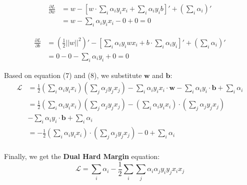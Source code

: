 \documentclass[a4paper,12pt]{article}
\begin{document}
\begin{equation}
    \begin{aligned}
        \frac{\partial L}{\partial w} &= w - \left[w\cdot \sum_i\alpha_iy_ix_i + \sum_i\alpha_iy_ib \right]' + (\sum_i\alpha_i)' \\
        &= w - \sum_i\alpha_iy_ix_i - 0 + 0 = 0
    \end{aligned}
\end{equation}

\begin{equation}
    \begin{aligned}
        \frac{\partial L}{\partial b} &= (\frac{1}{2}||w||^2)' - \left[\sum_i\alpha_iy_iwx_i + b\cdot\sum_i\alpha_iy_i \right]' + (\sum_i\alpha_i)' \\
        &= 0 - 0 - \sum_i\alpha_iy_i + 0 = 0
    \end{aligned}
\end{equation}

Based on equation (7) and (8), we substitute $\textbf{w}$ and $\textbf{b}$:
\begin{equation}
    \begin{aligned}
        \mathcal{L} &= \frac{1}{2}(\sum_i\alpha_iy_ix_i)(\sum_j\alpha_jy_jx_j) - \sum_i\alpha_iy_ix_i \cdot \textbf{w} -  \sum_i\alpha_iy_i \cdot \textbf{b} + \sum_i\alpha_i \\
        &= \frac{1}{2}(\sum_i\alpha_iy_ix_i)(\sum_j\alpha_jy_jx_j) - (\sum_i\alpha_iy_ix_i) \cdot (\sum_j\alpha_jy_jx_j) \\
        & - \sum_i\alpha_iy_i \cdot \textbf{b} + \sum_i\alpha_i \\
        &= -\frac{1}{2}(\sum_i\alpha_iy_ix_i) \cdot (\sum_j\alpha_jy_jx_j) -  0 + \sum_i\alpha_i \\
    \end{aligned}
\end{equation}

Finally, we get the \textbf{Dual Hard Margin} equation:
\begin{equation}
    \mathcal{L} = \sum_i\alpha_i -\frac{1}{2}\sum_i\sum_j\alpha_i\alpha_jy_iy_jx_ix_j
\end{equation}
\end{document}
